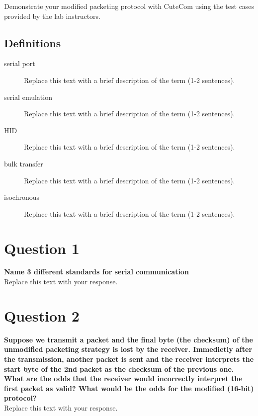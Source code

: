 \documentclass{article}
\begin{document}
Demonstrate your modified packeting protocol with CuteCom using the test cases provided by the lab instructors. 


\subsection{Definitions}
\label{definitions}
\begin{description}
\item[serial port]
Replace this text with a brief description of the term (1-2 sentences).
\item[serial emulation]
Replace this text with a brief description of the term (1-2 sentences).
\item[HID]
Replace this text with a brief description of the term (1-2 sentences).
\item[bulk transfer]
Replace this text with a brief description of the term (1-2 sentences).
\item[isochronous]
Replace this text with a brief description of the term (1-2 sentences).
\end{description} 
 

\section{Question 1}
\textbf{Name 3 different standards for serial communication}\\ 

Replace this text with your response.

\section{Question 2}
\textbf{Suppose we transmit a packet and the final byte (the checksum) of the unmodified packeting strategy is lost by the receiver. Immedietly after the transmission, another packet is sent and the receiver interprets the start byte of the 2nd packet as the checksum of the previous one. What are the odds that the receiver would incorrectly interpret the first packet as valid? What would be the odds for the modified (16-bit) protocol?}\\

Replace this text with your response.
\end{document}
